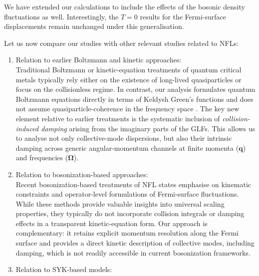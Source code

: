 \documentclass[aps, prb, onecolumn, nofootinbib, citeautoscript, 10pt]{revtex4-2}
\begin{document}
We have extended our calculations to include the effects of the bosonic density fluctuations as well. Interestingly, the $T=0$ results for the Fermi-surface displacements remain unchanged under this generalisation.

Let us now compare our studies with other relevant studies related to NFLs:
\begin{enumerate}
\item Relation to earlier Boltzmann and kinetic approaches:
\\Traditional Boltzmann or kinetic-equation treatments of quantum critical metals typically rely either on the existence of long-lived quasiparticles or focus on the collisionless regime. In contrast, our analysis formulates quantum Boltzmann equations directly in terms of Keldysh Green’s functions and does not assume quasiparticle-coherence in the frequency space \cite{prange, kim_qbe, ips-zero-mode}. The key new element relative to earlier treatments is the systematic inclusion of \textit{collision-induced damping} arising from the imaginary parts of the GLFs. This allows us to analyse not only collective-mode dispersions, but also their intrinsic damping across generic angular-momentum channels at finite momenta ($\mathbf q$) and frequencies ($\mathbf \Omega$).
\item Relation to bosonization-based approaches:
\\Recent bosonization-based treatments of NFL states \cite{yrkv-42wd} emphasise on kinematic constraints and operator-level formulations of Fermi-surface fluctuations. While these methods provide valuable insights into universal scaling properties, they typically do not incorporate collision integrals or damping effects in a transparent kinetic-equation form. Our approach is complementary: it retains explicit momentum resolution along the Fermi surface and provides a direct kinetic description of collective modes, including damping, which is not readily accessible in current bosonization frameworks.
\item Relation to SYK-based models:

\end{enumerate}
\end{document}
